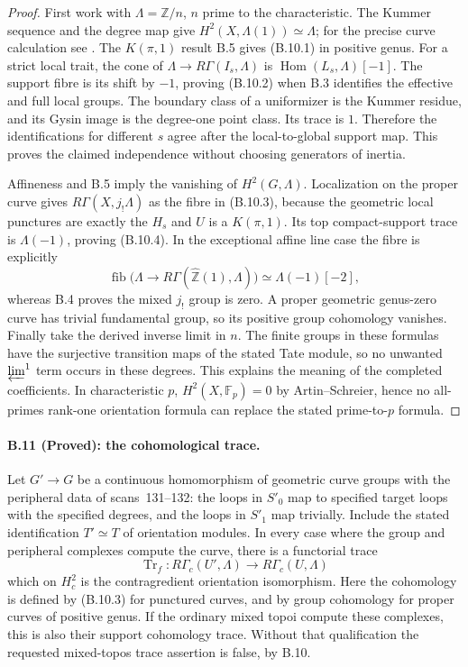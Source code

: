\begin{proof}
First work with $\Lambda=\mathbb Z/n$, $n$ prime to the
characteristic. The Kummer sequence and the degree map give
$H^2(X,\Lambda(1))\simeq\Lambda$; for the precise curve
calculation see \citet[Lemma~59.69.1]{StacksCurveKummer}.
The $K(\pi,1)$ result B.5 gives (B.10.1) in positive genus.
For a strict local trait, the cone of
$\Lambda\to R\Gamma(I_s,\Lambda)$ is
$\operatorname{Hom}(L_s,\Lambda)[-1]$. The support fibre is
its shift by $-1$, proving (B.10.2) when B.3 identifies the
effective and full local groups. The boundary class of a
uniformizer is the Kummer residue, and its Gysin image is
the degree-one point class. Its trace is $1$. Therefore the
identifications for different $s$ agree after the
local-to-global support map. This proves the claimed
independence without choosing generators of inertia.

Affineness and B.5 imply the vanishing of $H^2(G,\Lambda)$.
Localization on the proper curve gives
$R\Gamma(X,j_!\Lambda)$ as the fibre in (B.10.3), because
the geometric local punctures are exactly the $H_s$ and
$U$ is a $K(\pi,1)$. Its top compact-support trace is
$\Lambda(-1)$, proving (B.10.4). In the exceptional affine
line case the fibre is explicitly
\[
 \operatorname{fib}\bigl(\Lambda\to
 R\Gamma(\widehat{\mathbb Z}(1),\Lambda)\bigr)
                  \simeq\Lambda(-1)[-2],
\]
whereas B.4 proves the mixed $j_!$ group is zero. A proper
geometric genus-zero curve has trivial fundamental group,
so its positive group cohomology vanishes. Finally take the
derived inverse limit in $n$. The finite groups in these
formulas have the surjective transition maps of the stated
Tate module, so no unwanted $\varprojlim^1$ term occurs in
these degrees. This explains the meaning of the completed
coefficients. In characteristic $p$, $H^2(X,\mathbb F_p)=0$
by Artin--Schreier, hence no all-primes rank-one orientation
formula can replace the stated prime-to-$p$ formula.
\end{proof}

\paragraph{B.11 (Proved): the cohomological trace.}\label{B11}
Let $G'\to G$ be a continuous homomorphism of geometric
curve groups with the peripheral data of scans~131--132:
the loops in $S'_0$ map to specified target loops with the
specified degrees, and the loops in $S'_1$ map trivially.
Include the stated identification $T'\simeq T$ of
orientation modules. In every case where the group and
peripheral complexes compute the curve, there is a
functorial trace
\[
 \operatorname{Tr}_f:R\Gamma_c(U',\Lambda)
                      \longrightarrow R\Gamma_c(U,\Lambda)
                                                               \tag{B.11.1}
\]
which on $H^2_c$ is the contragredient orientation
isomorphism. Here the cohomology is defined by (B.10.3)
for punctured curves, and by group cohomology for proper
curves of positive genus. If the ordinary mixed topoi
compute these complexes, this is also their support
cohomology trace. Without that qualification the requested
mixed-topos trace assertion is false, by B.10.

